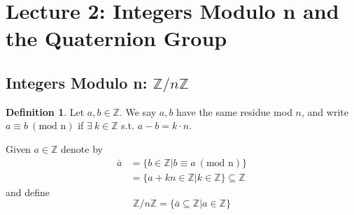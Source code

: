 \documentclass{article}
\theoremstyle{definition}
\newtheorem{definition}{Definition}[section]
\theoremstyle{remark}
\begin{document}
\section{Lecture 2: Integers Modulo n and the Quaternion Group}
\subsection{Integers Modulo n: \texorpdfstring{$\mathbb{Z}/n\mathbb{Z}$}{}}
\begin{definition}
	Let $a,b\in \mathbb{Z}$. We say $a,b$ have the same residue mod $n$, and write $a\equiv b~(\text{mod n})$ if $\exists~k\in \mathbb{Z}$ s.t. $a-b=k\cdot n$.
\end{definition}
Given $a\in \mathbb{Z}$ denote by
\begin{align*}
	\bar{a} & =\lbrace b\in \mathbb{Z}|b\equiv a~ (\text{mod n})\rbrace                   \\
	        & =\lbrace a + kn \in \mathbb{Z}| k\in \mathbb{Z}\rbrace \subseteq \mathbb{Z}
\end{align*}
and define
\begin{equation}
	\mathbb{Z}/n\mathbb{Z}=\lbrace \bar{a} \subseteq \mathbb{Z}|a\in \mathbb{Z}\rbrace
\end{equation}
\end{document}
